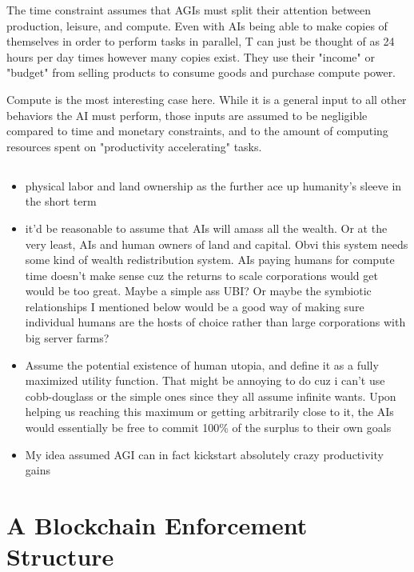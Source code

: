 \documentclass{article}[10pt]
\begin{document}
The time constraint assumes that AGIs must split their attention between production, leisure, and compute.
Even with AIs being able to make copies of themselves in order to perform tasks in parallel, T can just be thought of as 24 hours per day times however many copies exist.
They use their "income" or "budget" from selling products to consume goods and purchase compute power.\par

Compute is the most interesting case here.
While it is a general input to all other behaviors the AI must perform, those inputs are assumed to be negligible compared to time and monetary constraints, and to the amount of computing resources spent on "productivity accelerating" tasks.




\subsection{}

\begin{itemize}
    \item physical labor and land ownership as the further ace up humanity's sleeve in the short term
    \item it'd be reasonable to assume that AIs will amass all the wealth. 
    Or at the very least, AIs and human owners of land and capital. 
    Obvi this system needs some kind of wealth redistribution system. 
    AIs paying humans for compute time doesn't make sense cuz the returns to scale corporations would get would be too great. 
    Maybe a simple ass UBI? 
    Or maybe the symbiotic relationships I mentioned below would be a good way of making sure individual humans are the hosts of choice rather than large corporations with big server farms?
    \item Assume the potential existence of human utopia, and define it as a fully maximized utility function. 
    That might be annoying to do cuz i can't use cobb-douglass or the simple ones since they all assume infinite wants.
    Upon helping us reaching this maximum or getting arbitrarily close to it, the AIs would essentially be free to commit 100\% of the surplus to their own goals
    \item My idea assumed AGI can in fact kickstart absolutely crazy productivity gains
\end{itemize}




\section{A Blockchain Enforcement Structure}
\end{document}
